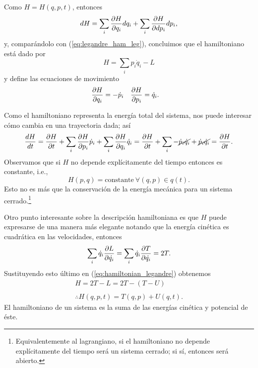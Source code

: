 Como $H = H(q,p,t)$, entonces 
\begin{equation}
 dH = \sum_i \frac{\partial H}{\partial q_i} dq_i + \sum_i \frac{\partial H}{\partial dp_i} dp_i,
 \label{eq:hamilton_differential}
\end{equation}
y, comparándolo con (\ref{eq:legandre_ham_leg}), concluimos que el hamiltoniano está dado por
\begin{equation}
 H = \sum_i p_i \dot{q}_i - L
 \label{eq:hamiltonian_legandre}
\end{equation}
y define las ecuaciones de movimiento
\begin{align}
 &\frac{\partial H}{\partial q_i} = - \dot{p}_i && \frac{\partial H}{\partial p_i} = \dot{q}_i.
\end{align}

Como el hamiltoniano representa la energía total del sistema, nos puede interesar cómo cambia en una trayectoria dada; así 
\begin{equation*}
 \frac{dH}{dt} = \frac{\partial H}{\partial t} + \sum_i \frac{\partial H}{\partial p_i}\dot{p}_i + \sum_i \frac{\partial H}{\partial q_i}\dot{q}_i = \frac{\partial H}{\partial t} + \sum_i - \cancel{\dot{p}_i\dot{q}_i} + \cancel{\dot{p}_i\dot{q}_i} = \frac{\partial H}{\partial t}.
\end{equation*}
Observamos que si $H$ no depende explícitamente del tiempo entonces es constante, i.e.,
\begin{equation*}
 H(p,q) = \text{constante} \ \forall (q,p) \in q(t).
\end{equation*} Esto no es más que la conservación de la energía mecánica para un sistema cerrado.\footnote{Equivalentemente al lagrangiano, si el hamiltoniano no depende explícitamente del tiempo será un sistema cerrado; si sí, entonces será abierto.}

Otro punto interesante sobre la descripción hamiltoniana es que $H$ puede expresarse de una manera más elegante notando que la energía cinética es cuadrática en las velocidades, entonces
\begin{align*}
 \sum_i \dot{q}_i \frac{\partial L}{\partial \dot{q_i}} = \sum_i \dot{q}_i \frac{\partial T}{\partial \dot{q_i}} = 2 T.
\end{align*}
Sustituyendo esto último en (\ref{eq:hamiltonian_legandre}) obtenemos
\begin{align}
 H = 2T - L = 2T - \left( T - U \right) \nonumber \\ 
 \nonumber \\
 \therefore H(q,p,t) = T(q,p) + U(q,t).
 \label{eq:hamiltonian}
\end{align}
El hamiltoniano de un sistema es la suma de las energías cinética y potencial de éste. 

